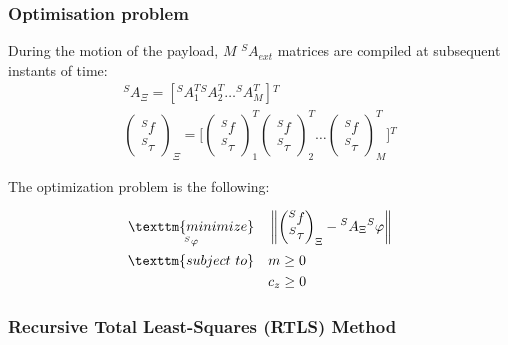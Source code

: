 \documentclass[usenames,dvipsnames]{beamer}
\newcommand{\norm}[1]{\left\lVert#1\right\rVert}
\begin{document}
\begin{frame}
 \frametitle{Optimisation problem}

During the motion of the payload, $M$ ${}^S A_{ext}$ matrices are compiled at subsequent instants of time:
\begin{gather}
  {}^S A_{\Xi} = [{}^S A_1^T {}^S A_2^T \ldots {}^S A_M^T] {}^T \\
  \begin{pmatrix}
   {}^S f    \\
   {}^S \tau
  \end{pmatrix}_{\Xi}
  = \Bigg[\begin{pmatrix}
   {}^S f    \\
   {}^S \tau
  \end{pmatrix}_1^T
  \begin{pmatrix}
   {}^S f    \\
   {}^S \tau
  \end{pmatrix}_2^T
  \ldots \begin{pmatrix}
   {}^S f    \\
   {}^S \tau
  \end{pmatrix}_M^T \Bigg] {}^T
\end{gather}

The optimization problem is the following:

\begin{align*}
  \underset{{}^S \varphi}{\texttm{minimize}} \quad &
    \norm{ \begin{pmatrix}
     {}^S f    \\
     {}^S \tau
   \end{pmatrix}_{\Xi}
    - {}^S A_{\Xi} {}^S \varphi } \\
  \texttm{subject \ to} \quad & m \geq 0 \\
                              & c_z \geq 0
\end{align*}

\end{frame}


\begin{frame}
 \frametitle{Recursive Total Least-Squares (RTLS) Method}

\end{frame}

\begin{frame}
 \frametitle{}

\end{frame}
\end{document}

